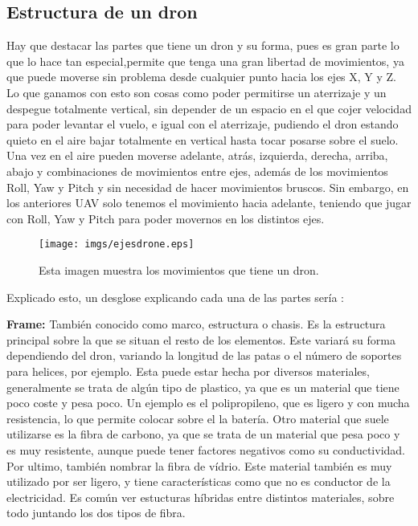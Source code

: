 \documentclass{article}
\begin{document}
\subsection{Estructura de un dron}
\hspace{1 cm} Hay que destacar las partes que tiene un dron y su forma, pues es gran parte lo que lo hace tan especial,permite que tenga una gran libertad de movimientos, ya que puede moverse sin problema desde cualquier punto hacia los ejes X, Y y Z. Lo que ganamos con esto son cosas como poder permitirse un aterrizaje y un despegue totalmente vertical, sin depender de un espacio en el que cojer velocidad para poder levantar el vuelo, e igual con el aterrizaje, pudiendo el dron estando quieto en el aire bajar totalmente en vertical hasta tocar posarse sobre el suelo. Una vez en el aire pueden moverse adelante, atr\'as, izquierda, derecha, arriba, abajo y combinaciones de movimientos entre ejes, adem\'as de los movimientos Roll, Yaw y Pitch y sin necesidad de hacer movimientos bruscos. Sin embargo, en los anteriores UAV solo tenemos el movimiento hacia adelante, teniendo que jugar con Roll, Yaw y Pitch para poder movernos en los distintos ejes.

\begin{figure}[ht]
	\centering
		\texttt{[image: imgs/ejesdrone.eps]}
		\caption{Esta imagen muestra los movimientos que tiene un dron.}
	\label{fig:ejesdrone}
\end{figure}

\hspace{1 cm} Explicado esto, un desglose explicando cada una de las partes ser\'ia :

\hspace{1 cm}\textbf{Frame:} Tambi\'en conocido como marco, estructura o chasis. Es la estructura principal sobre la que se situan el resto de los elementos. Este variar\'a su forma dependiendo del dron, variando la longitud de las patas o el n\'umero de soportes para helices, por ejemplo. Esta puede estar hecha por diversos materiales, generalmente se trata de alg\'un tipo de plastico, ya que es un material que tiene poco coste y pesa poco. Un ejemplo es el polipropileno, que es ligero y con mucha resistencia, lo que permite colocar sobre el la bater\'ia. Otro material que suele utilizarse es la fibra de carbono, ya que se trata de un material que pesa poco y es muy resistente, aunque puede tener factores negativos como su conductividad. Por ultimo, tambi\'en nombrar la fibra de v\'idrio. Este material tambi\'en es muy utilizado por ser ligero, y tiene caracter\'isticas como que no es conductor de la electricidad. Es com\'un ver estucturas h\'ibridas entre distintos materiales, sobre todo juntando los dos tipos de fibra. 
\end{document}
